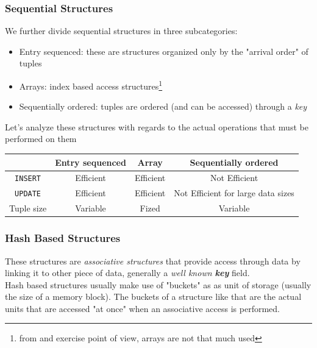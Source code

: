 \documentclass{article}
\begin{document}
				\subsubsection{Sequential Structures}
					We further divide sequential structures in three subcategories:
					\begin{itemize}
						\item Entry sequenced: these are structures organized only by the "arrival order" of tuples
						\item Arrays: index based access structures\footnote{from and exercise point of view, arrays are not that much used}
						\item Sequentially ordered: tuples are ordered (and can be accessed) through a \textit{key}
					\end{itemize}
					Let's analyze these structures with regards to the actual operations that must be performed on them
					\begin{center}
						\begin{tabular}{ c | c | c | c |}
							& Entry sequenced & Array & Sequentially ordered \\
							\hline
							\verb|INSERT| & Efficient & Efficient & Not Efficient \\
							\hline
							\verb|UPDATE| & Efficient & Efficient & Not Efficient for large data sizes \\
							\hline
							Tuple size & Variable & Fized & Variable \\
							\hline
						\end{tabular}
					\end{center}
				
				\subsubsection{Hash Based Structures}
					These structures are \textit{associative structures} that provide access through data by linking it to other piece of data, generally a \textit{well known \textbf{key}} field.\\
					Hash based structures usually make use of "buckets" as as unit of storage (usually the size of a memory block). The buckets of a structure like that are the actual units that are accessed "at once" when an associative access is performed.
\end{document}
